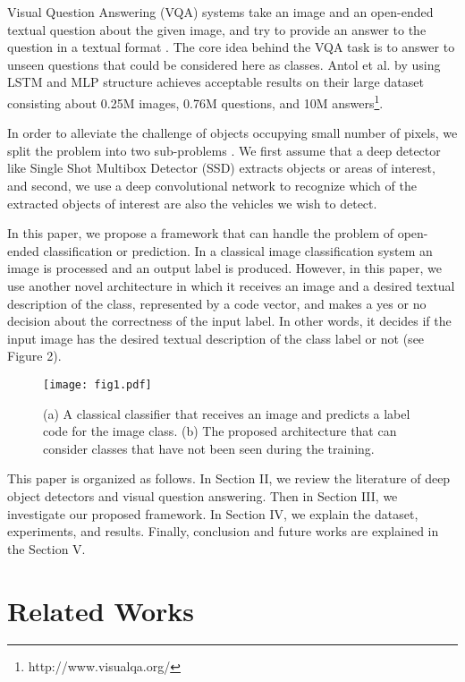 \documentclass[conference]{IEEEtran}
\begin{document}
Visual Question Answering (VQA) systems take an image and an open-ended textual question about the given image, and try to provide an answer to the question in a textual format \cite{vqapaper}. The core idea behind the VQA task is to answer to unseen questions that could be considered here as classes. Antol et al. by using LSTM and MLP structure achieves acceptable results on their large dataset consisting about 0.25M images, 0.76M questions, and 10M answers\footnote{http://www.visualqa.org/}.

In order to alleviate the challenge of objects occupying small number of pixels, we split the problem into two sub-problems \cite{fusion}. We first assume that a deep detector like Single Shot Multibox Detector (SSD) \cite{ssd} extracts objects or areas of interest, and second, we use a deep convolutional network to recognize which of the extracted objects of interest are also the vehicles we wish to detect.

In this paper, we propose a framework that can handle the problem of open-ended classification or prediction. In a classical image classification system an image is processed and an output label is produced. However, in this paper, we use another novel architecture in which it receives an image and a desired textual description of the class, represented by a code vector, and makes a yes or no decision about the correctness of the input label. In other words, it decides if the input image has the desired textual description of the class label or not (see Figure 2).

\begin{figure}[!t]
\centering
\texttt{[image: fig1.pdf]}\\
\caption{(a) A classical classifier that receives an image and predicts a label code for the image class. (b) The proposed architecture that can consider classes that have not been seen during the training.}
\label{fig_graph1}
\end{figure}

This paper is organized as follows. In Section II, we review the literature of deep object detectors and visual question answering. Then in Section III, we investigate our proposed framework. In Section IV, we explain the dataset, experiments, and results. Finally, conclusion and future works are explained in the Section V.


\section{Related Works}
\end{document}
